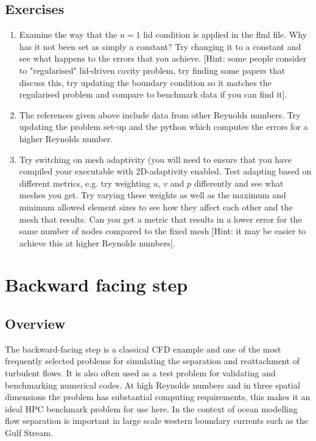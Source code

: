 \subsection{Exercises}
\begin{enumerate}
\item Examine the way that the $u=1$ lid condition is applied in the flml file. Why has it not been set as simply a constant?
Try changing it to a constant and see what happens to the errors that you achieve. [Hint: some people consider to "regularised" 
lid-driven cavity problem, try finding some papers that discuss this, try updating the boundary condition so it matches the 
regularised problem and compare to benchmark data if you can find it].
\item The references given above include data from other Reynolds numbers. Try updating the problem set-up and the python which computes
the errors for a higher Reynolds number.
\item Try switching on mesh adaptivity (you will need to ensure that you have compiled your \fluidity executable with 2D-adaptivity enabled. 
Test adapting based on different metrics, e.g. try weighting $u$, $v$ and $p$
differently and see what meshes you get. Try varying these weights as well as the maximum and minimum allowed element
sizes to see how they affect each other and the mesh that results. Can you get a metric that results in a lower
error for the same number of nodes compared to the fixed mesh [Hint: it may be easier to achieve this at higher Reynolds numbers].
\end{enumerate}



\section{Backward facing step}
\label{sect:backward_facing_step}


\subsection{Overview}
The backward-facing step is a classical CFD example and one of the most frequently selected
problems for simulating the separation and reattachment of turbulent flows.
It is also often used as a test problem for validating and benchmarking numerical codes.
At high Reynolds numbers and in three spatial dimensions the problem has substantial
computing requirements, this makes it an ideal HPC benchmark problem for use here.
In the context of ocean modelling flow separation is important
in large scale western boundary currents such as the Gulf Stream.

